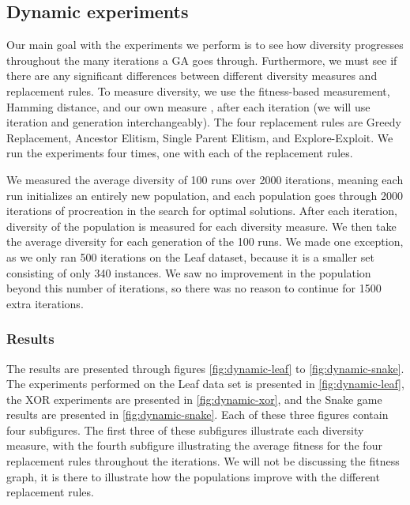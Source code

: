 \subsection{Dynamic experiments}\label{sec:continuousdiversity}
Our main goal with the experiments we perform is to see how diversity progresses throughout the many iterations a GA goes through. Furthermore, we must see if there are any significant differences between different diversity measures and replacement rules. To measure diversity, we use the fitness-based measurement, Hamming distance, and our own measure \dia, after each iteration (we will use iteration and generation interchangeably). The four replacement rules are Greedy Replacement, Ancestor Elitism, Single Parent Elitism, and Explore-Exploit. We run the experiments four times, one with each of the replacement rules.

We measured the average diversity of \num{100} runs over \num{2000} iterations, meaning each run initializes an entirely new population, and each population goes through \num{2000} iterations of procreation in the search for optimal solutions. After each iteration, diversity of the population is measured for each diversity measure. We then take the average diversity for each generation of the \num{100} runs. We made one exception, as we only ran \num{500} iterations on the Leaf dataset, because it is a smaller set consisting of only \num{340} instances. We saw no improvement in the population beyond this number of iterations, so there was no reason to continue for \num{1500} extra iterations. %


\subsubsection{Results}
The results are presented through figures \ref{fig:dynamic-leaf} to \ref{fig:dynamic-snake}. The experiments performed on the Leaf data set is presented in \cref{fig:dynamic-leaf}, the XOR experiments are presented in \cref{fig:dynamic-xor}, and the Snake game results are presented in \cref{fig:dynamic-snake}. Each of these three figures contain four subfigures. The first three of these subfigures illustrate each diversity measure, with the fourth subfigure illustrating the average fitness for the four replacement rules throughout the iterations. We will not be discussing the fitness graph, it is there to illustrate how the populations improve with the different replacement rules.


